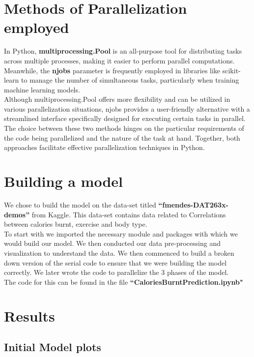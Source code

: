\documentclass{article}
\begin{document}
\section{Methods of Parallelization employed}
In Python, \textbf{multiprocessing.Pool} is an all-purpose tool for distributing tasks across multiple processes, making it easier to perform parallel computations. Meanwhile, the \textbf{n\textunderscore{}jobs} parameter is frequently employed in libraries like scikit-learn to manage the number of simultaneous tasks, particularly when training machine learning models. \\ 
Although multiprocessing.Pool offers more flexibility and can be utilized in various parallelization situations, n\textunderscore{}jobs provides a user-friendly alternative with a streamlined interface specifically designed for executing certain tasks in parallel. The choice between these two methods hinges on the particular requirements of the code being parallelized and the nature of the task at hand. Together, both approaches facilitate effective parallelization techniques in Python.

\section{Building a model}
We chose to build the model on the data-set titled \textbf{``fmendes-DAT263x-demos''} from Kaggle. This data-set contains data related to Correlations between calories burnt, exercise and body type. \\
To start with we imported the necessary module and packages with which we would build our model. We then conducted our data pre-processing and visualization to understand the data. We then commenced to build a broken down version of the serial code to ensure that we were building the model correctly. We later wrote the code to parallelize the 3 phases of the model.\\

The code for this can be found in the file \textbf{``Calories\textunderscore{}Burnt\textunderscore{}Prediction.ipynb"}

\section{Results}

\subsection{Initial Model plots}
\end{document}
